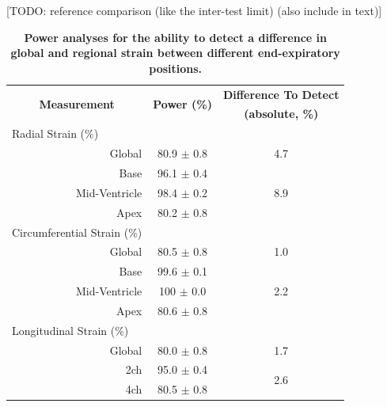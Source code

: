 	[TODO: reference comparison (like the inter-test limit) (also include in text)]
	\begin{table}
		\centering
		\caption[Power analyses for the ability to detect a difference in global and regional strain between different end-expiratory positions]{\textbf{Power analyses for the ability to detect a difference in global and regional strain between different end-expiratory positions.}}
		\label{table:strainDifferencesPower}
		\begin{tabular}{c c c}
			\toprule
			\multirow{2}{*}{\textbf{Measurement}} & \multirow{2}{*}{\textbf{Power (\%)}} & \textbf{Difference To Detect}  \\
			 & & \textbf{(absolute, \%)}\\
			\midrule
			\multicolumn{1}{l}{Radial Strain (\%)} & &                                 \\
			\multicolumn{1}{r}{Global}  	  & 80.9 $\pm$ 0.8 & 4.7                   \\
			\multicolumn{1}{r}{Base}  		  & 96.1 $\pm$ 0.4 & \multirow{3}{*}{8.9}  \\
			\multicolumn{1}{r}{Mid-Ventricle} & 98.4 $\pm$ 0.2 &                       \\
			\multicolumn{1}{r}{Apex}  		  & 80.2 $\pm$ 0.8 &                       \\
			\multicolumn{1}{l}{Circumferential Strain (\%)} & &                        \\
			\multicolumn{1}{r}{Global}  	  & 80.5 $\pm$ 0.8 & 1.0                   \\
			\multicolumn{1}{r}{Base}  		  & 99.6 $\pm$ 0.1 & \multirow{3}{*}{2.2}  \\
			\multicolumn{1}{r}{Mid-Ventricle} & 100 $\pm$ 0.0  &                       \\
			\multicolumn{1}{r}{Apex}  		  & 80.6 $\pm$ 0.8 &                       \\
			\multicolumn{1}{l}{Longitudinal Strain (\%)} & & 	    				   \\
			\multicolumn{1}{r}{Global}        & 80.0 $\pm$ 0.8 &  1.7                  \\
			\multicolumn{1}{r}{2ch}  		  & 95.0 $\pm$ 0.4 &  \multirow{2}{*}{2.6} \\
			\multicolumn{1}{r}{4ch}  		  & 80.5 $\pm$ 0.8 &     				   \\ 
			\bottomrule
		\end{tabular}
	\end{table}

